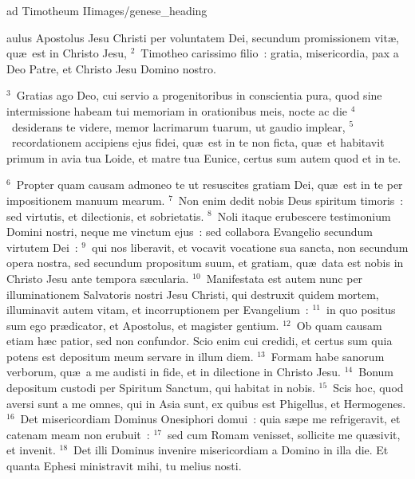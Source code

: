 {ad Timotheum II}{images/genese_heading}


\bchapter
{}aulus Apostolus Jesu Christi per voluntatem Dei, secundum promissionem vit\ae , qu\ae\ est in Christo Jesu,
${}^{2}$~Timotheo carissimo filio~: gratia, misericordia, pax a Deo Patre, et Christo Jesu Domino nostro.


${}^{3}$~Gratias ago Deo, cui servio a progenitoribus in conscientia pura, quod sine intermissione habeam tui memoriam in orationibus meis, nocte ac die
${}^{4}$~desiderans te videre, memor lacrimarum tuarum, ut gaudio implear,
${}^{5}$~recordationem accipiens ejus fidei, qu\ae\ est in te non ficta, qu\ae\ et habitavit primum in avia tua Loide, et matre tua Eunice, certus sum autem quod et in te.


${}^{6}$~Propter quam causam admoneo te ut resuscites gratiam Dei, qu\ae\ est in te per impositionem manuum mearum.
${}^{7}$~Non enim dedit nobis Deus spiritum timoris~: sed virtutis, et dilectionis, et sobrietatis.
${}^{8}$~Noli itaque erubescere testimonium Domini nostri, neque me vinctum ejus~: sed collabora Evangelio secundum virtutem Dei~:
${}^{9}$~qui nos liberavit, et vocavit vocatione sua sancta, non secundum opera nostra, sed secundum propositum suum, et gratiam, qu\ae\ data est nobis in Christo Jesu ante tempora s\ae cularia.
${}^{10}$~Manifestata est autem nunc per illuminationem Salvatoris nostri Jesu Christi, qui destruxit quidem mortem, illuminavit autem vitam, et incorruptionem per Evangelium~:
${}^{11}$~in quo positus sum ego pr\ae dicator, et Apostolus, et magister gentium.
${}^{12}$~Ob quam causam etiam h\ae c patior, sed non confundor. Scio enim cui credidi, et certus sum quia potens est depositum meum servare in illum diem.
${}^{13}$~Formam habe sanorum verborum, qu\ae\ a me audisti in fide, et in dilectione in Christo Jesu.
${}^{14}$~Bonum depositum custodi per Spiritum Sanctum, qui habitat in nobis.
${}^{15}$~Scis hoc, quod aversi sunt a me omnes, qui in Asia sunt, ex quibus est Phigellus, et Hermogenes.
${}^{16}$~Det misericordiam Dominus Onesiphori domui~: quia s\ae pe me refrigeravit, et catenam meam non erubuit~:
${}^{17}$~sed cum Romam venisset, sollicite me qu\ae sivit, et invenit.
${}^{18}$~Det illi Dominus invenire misericordiam a Domino in illa die. Et quanta Ephesi ministravit mihi, tu melius nosti.

